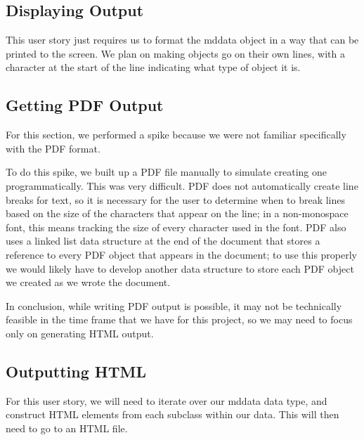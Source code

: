\subsection{Displaying Output}
This user story just requires us to format the mddata object in a way that can be printed to the screen.
We plan on making objects go on their own lines, with a character at the start of the line indicating what type of object it is.

\subsection{Getting PDF Output}
For this section, we performed a spike because we were not familiar specifically with the PDF format.

To do this spike, we built up a PDF file manually to simulate creating one programmatically. This was very difficult. PDF does not automatically create line breaks for text, so it is necessary for the user to determine when to break lines based on the size of the characters that appear on the line; in a non-monospace font, this means tracking the size of every character used in the font. PDF also uses a linked list data structure at the end of the document that stores a reference to every PDF object that appears in the document; to use this properly we would likely have to develop another data structure to store each PDF object we created as we wrote the document.

In conclusion, while writing PDF output is possible, it may not be technically feasible in the time frame that we have for this project, so we may need to focus only on generating HTML output.

\subsection{Outputting HTML}
For this user story, we will need to iterate over our mddata data type, and construct HTML elements from each subclass within our data. This will then need to go to an HTML file.


